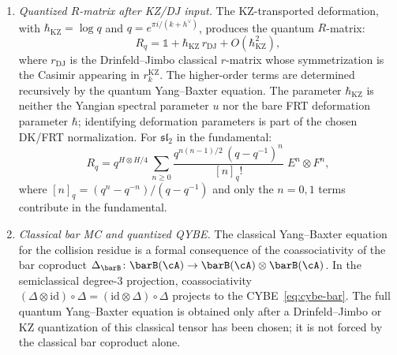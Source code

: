 \begin{proposition}
\begin{enumerate}[label=\textup{(\roman*)}]
\item \emph{Quantized $R$-matrix after KZ/DJ input.}
 The KZ-transported deformation, with
 $\hbar_{\mathrm{KZ}} = \log q$ and
 $q = e^{\pi i / (k + h^\vee)}$, produces
 the quantum $R$-matrix:
 \begin{equation}\label{eq:quantum-R-from-bar}
 R_q = \mathbb{1} + \hbar_{\mathrm{KZ}}\, r_{\mathrm{DJ}}
 + O(\hbar_{\mathrm{KZ}}^2),
 \end{equation}
 where \(r_{\mathrm{DJ}}\) is the Drinfeld--Jimbo classical
 \(r\)-matrix whose symmetrization is the Casimir appearing in
 \(r^{\mathrm{KZ}}_k\). The higher-order terms are determined
 recursively by the quantum Yang--Baxter equation. The parameter
 \(\hbar_{\mathrm{KZ}}\) is neither the Yangian spectral parameter
 \(u\) nor the bare FRT deformation parameter \(\hbar\); identifying
 deformation parameters is part of the chosen DK/FRT normalization.
 For
 $\mathfrak{sl}_2$ in the fundamental:
 \begin{equation}\label{eq:quantum-R-sl2-explicit}
 R_q = q^{H \otimes H / 4}\,
 \sum_{n \geq 0}
 \frac{q^{n(n-1)/2}\,(q - q^{-1})^n}{[n]_q!}\;
 E^n \otimes F^n,
 \end{equation}
 where $[n]_q = (q^n - q^{-n})/(q - q^{-1})$ and only the
 $n = 0, 1$ terms contribute in the fundamental.

\item \emph{Classical bar MC and quantized QYBE.}
 The classical Yang--Baxter equation for the collision residue is a
 formal consequence of the coassociativity of the bar coproduct
 $\Delta_{\barB}\colon \barB(\cA) \to
 \barB(\cA) \otimes \barB(\cA)$.
 In the semiclassical degree-$3$ projection, coassociativity
 $(\Delta \otimes \mathrm{id}) \circ \Delta
 = (\mathrm{id} \otimes \Delta) \circ \Delta$
 projects to the CYBE~\eqref{eq:cybe-bar}.
 The full quantum Yang--Baxter equation is obtained only after a
 Drinfeld--Jimbo or KZ quantization of this classical tensor has been
 chosen; it is not forced by the classical bar coproduct alone.
\end{enumerate}
\end{proposition}

